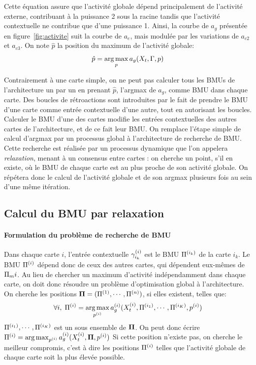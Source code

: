 Cette équation assure que l'activité globale dépend principalement de l'activité externe, contribuant à la puissance 2 sous la racine tandis que l'activité contextuelle ne contribue que d'une puissance 1. Ainsi, la courbe de $a_g$ présentée en figure~\ref{fig:activite} suit la courbe de $a_e$, mais modulée par les variations de $a_{c2}$ et $a_{c3}$.
On note $\hat{p}$ la position du maximum de l'activité globale:
\begin{equation}
\label{argmax}
\hat{p} = \operatorname*{arg\,max}_p a_g(X_t, \Gamma,p)
\end{equation}

Contrairement à une carte simple, on ne peut pas calculer tous les BMUs de l'architecture un par un en prenant $\hat{p}$, l'argmax de $a_g$, comme BMU dans chaque carte. Des boucles de rétroactions sont introduites par le fait de prendre le BMU d'une carte comme entrée contextuelle d'une autre, tout en autorisant les boucles. Calculer le BMU d'une des cartes modifie les entrées contextuelles des autres cartes de l'architecture, et de ce fait leur BMU. 
On remplace l'étape simple de calcul d'argmax par un processus global à l'architecture de recherche de BMU. Cette recherche est réalisée par un processus dynamique que l'on appelera \emph{relaxation}, menant à un consensus entre cartes : on cherche un point, s'il en existe, où le BMU de chaque carte est au plus proche de son activité globale. On répétera donc le calcul de l'activité globale et de son argmax plusieurs fois au sein d'une même itération.



\subsection{Calcul du BMU par relaxation}\label{sec:relax}

\paragraph{Formulation du problème de recherche de BMU}
Dans chaque carte $i$, l'entrée contextuelle $\gamma^{({i})}_{i_k}$ est le BMU $\Pi^{({i_k})}$  de la carte $i_k$. Le BMU $\Pi^{({i})}$ dépend donc de ceux des autres cartes, qui dépendent eux-mêmes de $\Pi_m{i}$. Au lieu de chercher un maximum d'activité indépendamment dans chaque carte, on doit donc résoudre un problème d'optimisation global à  l'architecture. On cherche les positions $\mathbf{\Pi} = (\Pi^{({1})}, \cdots, \Pi^{({n})})$, si elles existent, telles que:
\begin{equation}
\forall i, \; \Pi^{({i})} = \operatorname*{arg\,max}_{p^{({i})}} a_g^{({i})}(X^{({i})}_t, \Pi^{({i_1})}, \cdots, \Pi^{({i_K})},p^{({i})})
\end{equation}
$\Pi^{({i_1})}, \cdots, \Pi^{({i_K})}$ est un sous ensemble de $\mathbf{\Pi}$. On peut donc écrire $\Pi^{({i})} = \operatorname*{arg\,max}_{p^{({i})}} a_g^{({i})}(X^{({i})}_t, \mathbf{\Pi}, p^{({i})})$
Si cette position n'existe pas, on cherche le meilleur compromis, c'est à dire les positions $\Pi^{({i})}$ telles que l'activité globale de chaque carte soit la plus élevée possible.


